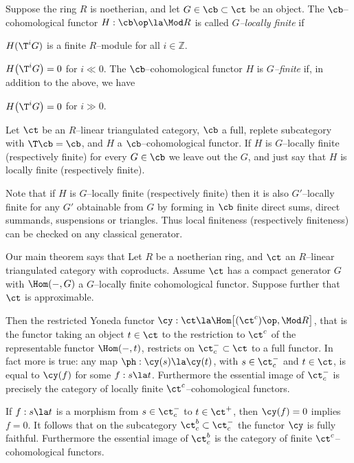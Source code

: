\documentclass[11pt]{amsart}
\newcommand{\zz}{{\mathbb Z}}
\begin{document}
Suppose the ring $R$ is noetherian,
and let $G\in\cb\subset\ct$ be an object. The $\cb$--cohomological
functor $H:\cb\op\la\Mod R$ is called \emph{$G$--locally finite} if
\be
\item
  $H(\T^iG)$ is a finite $R$--module for all $i\in\zz$.
\item
  $H\big(\T^iG\big)=0$ for $i\ll 0$.
\setcounter{enumiv}{\value{enumi}}
\ee
The $\cb$--cohomological functor $H$ is \emph{$G$--finite} if, in addition to
the above, we have
\be
\setcounter{enumi}{\value{enumiv}}
\item
  $H\big(\T^iG\big)=0$ for $i\gg 0$.
\setcounter{enumiv}{\value{enumi}}
\ee
\edfn

Let $\ct$  be an $R$--linear triangulated category,
$\cb$ a full, replete subcategory with $\T\cb=\cb$, and $H$ a
$\cb$--cohomological functor. If $H$ is $G$--locally finite
(respectively finite)
for every $G\in\cb$ we leave out the $G$, and just say that
$H$ is locally finite (respectively finite).

Note that if $H$ is $G$--locally finite (respectively finite) then
it is also $G'$--locally finite for any $G'$ obtainable from
$G$ by forming in $\cb$  finite direct sums, direct summands,
suspensions or triangles.
Thus local finiteness (respectively finiteness) can be checked
on any classical generator.
\ermk

Our main theorem says that
Let $R$ be a noetherian ring, and
$\ct$ an $R$--linear triangulated category with coproducts.
Assume $\ct$
has a compact generator $G$ with $\Hom(-,G)$ a $G$--locally finite
cohomological functor. Suppose further that $\ct$ is approximable.


Then the restricted Yoneda functor
$\cy:\ct\la \Hom\big[(\ct^c)\op,\Mod R\big]$, that is
the functor taking an object $t\in\ct$ to the
restriction to $\ct^c$ of the 
representable functor $\Hom(-,t)$, restricts on $\ct^-_c\subset\ct$
to a full functor.
In fact more is true: any map $\ph:\cy(s)\la\cy(t)$, with $s\in\ct^-_c$ and
$t\in\ct$, is equal to $\cy(f)$ for some $f:s\la t$.
Furthermore the essential image of $\ct^-_c$ is precisely the category
of locally finite $\ct^c$--cohomological functors.

If $f:s\la t$ is a morphism from $s\in\ct^-_c$ to $t\in\ct^+$, then
$\cy(f)=0$ implies $f=0$. It follows that
on the subcategory $\ct^b_c\subset\ct^-_c$ the functor $\cy$ is
fully faithful. Furthermore the essential image of $\ct^b_c$
is the category of finite $\ct^c$--cohomological functors.
\ethm
\end{document}
